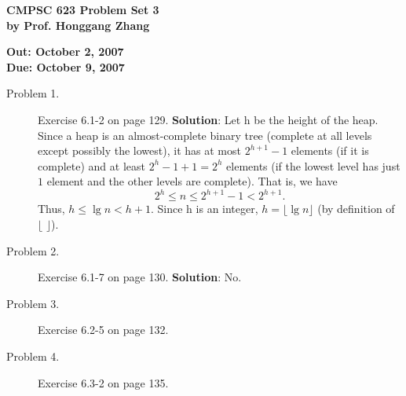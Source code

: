 \documentclass[11pt]{article}
\begin{document}

\begin{center}
{\bf CMPSC 623 Problem Set 3} \\
{\bf by Prof. Honggang Zhang} \\
\end{center}
\begin{center}
{\bf Out: October 2, 2007} \\
{\bf Due: October 9, 2007} \\

\end{center}


\begin{description}




\item[Problem 1.] Exercise 6.1-2 on page 129.
\noindent \textbf{Solution}: Let h be the height of the heap. Since a heap is an almost-complete
binary tree (complete at all levels except possibly the lowest), it has at most $2^{h+1}-1$
elements (if it is complete) and at least $2^h-1+1=2^h$ elements (if the lowest level has just $1$
element and the other levels are complete). That is, we have
$$
2^h \le n \le 2^{h+1}-1 < 2^{h+1}.
$$
Thus, $h\le \lg n < h+1$. Since h is an integer, $h=\lfloor \lg n \rfloor $ (by definition of
$\lfloor$ $\rfloor$).


\item[Problem 2.] Exercise 6.1-7 on page 130.
\noindent \textbf{Solution}: No.


\item[Problem 3.] Exercise 6.2-5 on page 132.

\item[Problem 4.] Exercise 6.3-2 on page 135.




\end{description}
\end{document}
